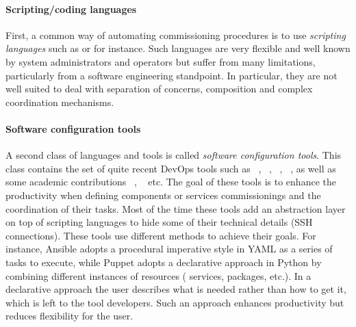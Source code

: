\paragraph{Scripting/coding languages}
First, a common way of automating commissioning procedures is to use
\emph{scripting languages} such as \shell or \ruby for instance. Such
languages are very flexible and well known by system administrators
and operators but suffer from many limitations, particularly from a
software engineering standpoint. In particular, they are not well
suited to deal with separation of concerns, composition and complex
coordination mechanisms.

\paragraph{Software configuration tools}
A second class of languages and tools is called \emph{software
  configuration tools}. This class contains the set of quite recent
DevOps tools such as \ansible~\cite{ansible:web},
\puppet~\cite{puppet:web}, \chef~\cite{chef:web},
\salt~\cite{salt:web}, as well as some academic contributions
\deployware~\cite{flissi2008ccgrid},
\aeolus~\cite{dicosmo2014ic,dicosmo:hal-01233489} etc. The goal of
these tools is to enhance the productivity when defining components or
services commissionings and the coordination of their tasks. Most of
the time these tools add an abstraction layer on top of scripting languages
to hide some of their technical details (\eg SSH connections). These
tools use different methods to achieve their goals. For instance,
Ansible adopts a procedural imperative style in YAML as a
series of tasks to execute, while Puppet adopts a declarative approach
in Python by combining different instances of resources (\ie
services, packages, etc.). In a declarative approach the user describes
what is needed rather than how to get it, which is left to the tool
developers. Such an approach enhances productivity but reduces
flexibility for the user.


